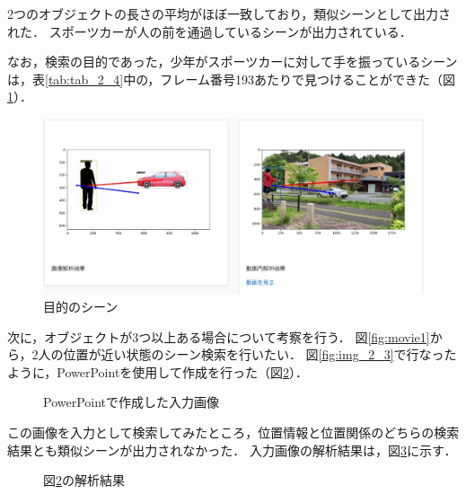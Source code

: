 \documentclass[a4j,12pt,dvipdfmx]{jreport}
\begin{document}
2つのオブジェクトの長さの平均がほぼ一致しており，類似シーンとして出力された．
スポーツカーが人の前を通過しているシーンが出力されている．

なお，検索の目的であった，少年がスポーツカーに対して手を振っているシーンは，表\ref{tab:tab_2_4}中の，フレーム番号193あたりで見つけることができた（図\ref{fig:img_2_3_3}）．
\begin{figure}[t]
  \centering
  \includegraphics[width=13cm]{image/result_2_3_3.jpg}
  \caption{目的のシーン}
  \label{fig:img_2_3_3}
\end{figure}

次に，オブジェクトが3つ以上ある場合について考察を行う．
図\ref{fig:movie1}から，2人の位置が近い状態のシーン検索を行いたい．
図\ref{fig:img_2_3}で行なったように，PowerPointを使用して作成を行った（図\ref{fig:img_2_4}）．

\begin{figure}[h]
  \centering
  \caption{PowerPointで作成した入力画像}
  \label{fig:img_2_4}
\end{figure}


この画像を入力として検索してみたところ，位置情報と位置関係のどちらの検索結果とも類似シーンが出力されなかった．
入力画像の解析結果は，図\ref{fig:img_2_4_1}に示す．
\begin{figure}[h]
  \centering
  \caption{図\ref{fig:img_2_4}の解析結果}
  \label{fig:img_2_4_1}
\end{figure}
\end{document}
